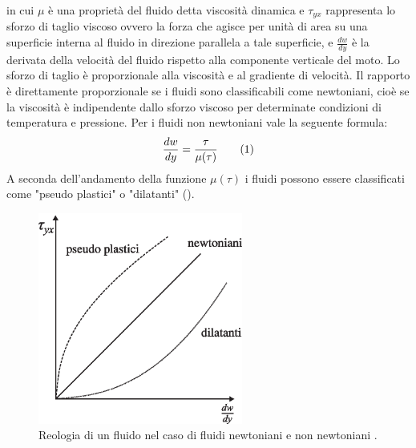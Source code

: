 in cui \(\mu\) è una proprietà del fluido detta viscosità dinamica e \(\tau_{yx}\) rappresenta lo sforzo di taglio viscoso ovvero la forza che agisce per unità di area su  una superficie interna al fluido in direzione parallela a tale superficie, e \(\frac{dw}{dy}\) è la derivata della velocità del fluido rispetto alla componente verticale del moto. Lo sforzo di taglio è proporzionale alla viscosità e al gradiente di velocità. Il rapporto è direttamente proporzionale se i fluidi sono classificabili come newtoniani, cioè se la viscosità è indipendente dallo sforzo viscoso per determinate condizioni di temperatura e pressione. Per i fluidi non newtoniani vale la seguente formula:
\[\frac{dw}{dy}=\frac{\tau}{\mu(\tau)}\addtag\label{eq:newtoniani}\]
A seconda dell'andamento della funzione \(\mu(\tau)\) i fluidi possono essere classificati come "pseudo plastici" o "dilatanti" ().
\begin{figure}[htbp] %
    \centering
    \includegraphics[width=0.6\textwidth]{fig/fluidodinamica/newtoniani.eps}
    \caption{Reologia di un fluido nel caso di fluidi newtoniani e non newtoniani \parencite{guglielmini2004lezioni}.} 
    \label{fig:newtoniani}
\end{figure}
